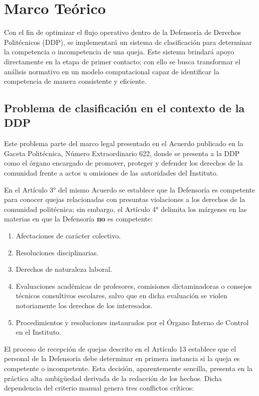 \chapter{Marco Teórico}

Con el fin de optimizar el flujo operativo dentro de la Defensoría de Derechos
Politécnicos (DDP), se implementará un sistema de clasificación para determinar
la competencia o incompetencia de una queja. Este sistema brindará apoyo
directamente en la etapa de primer contacto; con ello se busca transformar el
análisis normativo en un modelo computacional capaz de identificar la competencia
de manera consistente y eficiente.

\section{Problema de clasificación en el contexto de la DDP}

Este problema parte del marco legal presentado en el Acuerdo publicado en la
Gaceta Politécnica, Número Extraordinario 622, donde se presenta a la DDP como
el órgano encargado de promover, proteger y defender los derechos de la comunidad
frente a actos u omisiones de las autoridades del Instituto.

En el Artículo 3° del mismo Acuerdo se establece que la Defensoría es competente
para conocer quejas relacionadas con presuntas violaciones a los derechos de la
comunidad politécnica; sin embargo, el Artículo 4° delimita los márgenes en las
materias en que la Defensoría \textbf{no} es competente:

\begin{enumerate}
  \item Afectaciones de carácter colectivo.
  \item Resoluciones disciplinarias.
  \item Derechos de naturaleza laboral.
  \item Evaluaciones académicas de profesores, comisiones dictaminadoras o
        consejos técnicos consultivos escolares, salvo que en dicha evaluación
        se violen notoriamente los derechos de los interesados.
  \item Procedimientos y resoluciones instaurados por el Órgano Interno de
        Control en el Instituto.
\end{enumerate}

El proceso de recepción de quejas descrito en el Artículo 13 establece que el
personal de la Defensoría debe determinar en primera instancia si la queja es
competente o incompetente. Esta decisión, aparentemente sencilla, presenta en la
práctica alta ambigüedad derivada de la redacción de los hechos. Dicha
dependencia del criterio manual genera tres conflictos críticos:

